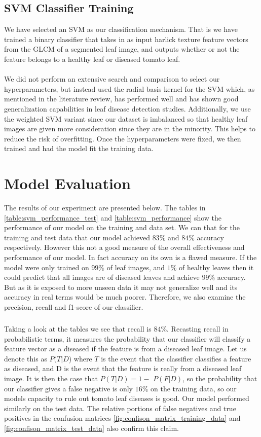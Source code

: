 \subsection{SVM Classifier Training}
We have selected an SVM as our classification mechanism. That is we have
trained a binary classifier that takes in as input harlick texture feature vectors
from the GLCM of a segmented leaf image, and outputs whether or not the
feature belongs to a healthy leaf or diseased tomato leaf.

\paragraph{}
We did not perform an extensive search and comparison to select our hyperparameters, but instead used the radial basis kernel for the SVM which, as
mentioned in the literature review, has performed well and has shown good generalization capabilities in leaf disease detection studies. Additionally, we use
the weighted SVM variant since our dataset is imbalanced so that healthy leaf
images are given more consideration since they are in the minority. This helps
to reduce the risk of overfitting. Once the hyperparameters were fixed, we then
trained and had the model fit the training data.

\section{Model Evaluation}
The results of our experiment are presented below. The tables in \ref{table:svm_performance_test} and \ref{table:svm_performance}
show the performance of our model on the training and data set. We can that
for the training and test data that our model achieved $83\%$ and $84\%$ accuracy
respectively. However this not a good measure of the overall effectiveness and
performance of our model. In fact accuracy on its own is a flawed measure. If
the model were only trained on $99\%$ of leaf images, and $1\%$ of healthy leaves
then it could predict that all images are of diseased leaves and achieve $99\%$
accuracy. But as it is exposed to more unseen data it may not generalize well
and its accuracy in real terms would be much poorer. Therefore, we also examine
the precision, recall and f1-score of our classifier.

\subparagraph{}
Taking a look at the tables we see that recall is $84\%$. Recasting recall in
probabilistic terms, it measures the probability that our classifier will classify a
feature vector as a diseased if the feature is from a diseased leaf image. Let
us denote this as $P(T | D$) where $T$ is the event that the classifier classifies a
feature as diseased, and D is the event that the feature is really from a diseased
leaf image. It is then the case that $P(T | D) = 1 - $ $P(F | D)$, so the probability
that our classifier gives a false negative is only $16\%$ on the training data, so our
models capacity to rule out tomato leaf diseases is good. Our model performed
similarly on the test data. The relative portions of false negatives and true
positives in the confusion matrices \ref{fig:confison_matrix_training_data} and \ref{fig:confison_matrix_test_data} also confirm this claim.

